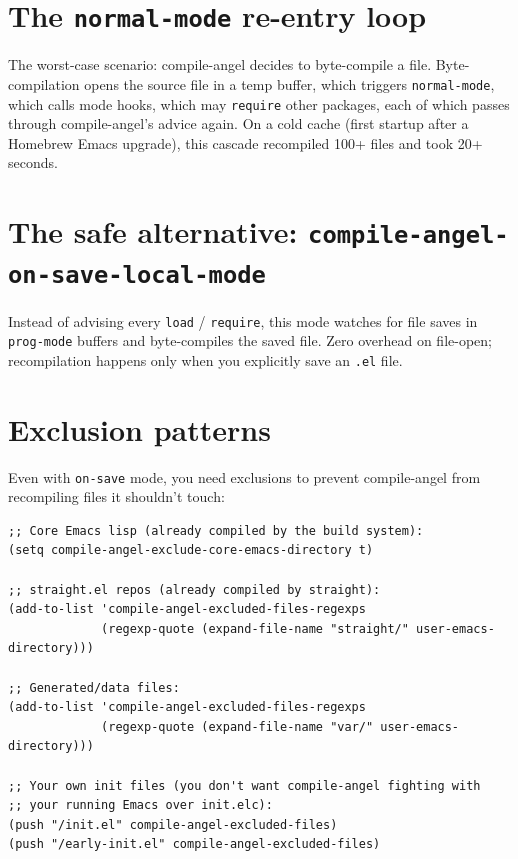 \section{The \texttt{normal-mode} re-entry loop}\label{the-normal-mode-re-entry-loop}

The worst-case scenario: compile-angel decides to byte-compile a file. Byte-compilation opens the source file in a temp buffer, which triggers \texttt{normal-mode}, which calls mode hooks, which may \texttt{require} other packages, each of which passes through compile-angel's advice again. On a cold cache (first startup after a Homebrew Emacs upgrade), this cascade recompiled 100+ files and took 20+ seconds.

\section{The safe alternative: \texttt{compile-angel-on-save-local-mode}}\label{the-safe-alternative-compile-angel-on-save-local-mode}

Instead of advising every \texttt{load} / \texttt{require}, this mode watches for file saves in \texttt{prog-mode} buffers and byte-compiles the saved file. Zero overhead on file-open; recompilation happens only when you explicitly save an \texttt{.el} file.

\section{Exclusion patterns}\label{exclusion-patterns}

Even with \texttt{on-save} mode, you need exclusions to prevent compile-angel from recompiling files it shouldn't touch:

\begin{verbatim}
;; Core Emacs lisp (already compiled by the build system):
(setq compile-angel-exclude-core-emacs-directory t)

;; straight.el repos (already compiled by straight):
(add-to-list 'compile-angel-excluded-files-regexps
             (regexp-quote (expand-file-name "straight/" user-emacs-directory)))

;; Generated/data files:
(add-to-list 'compile-angel-excluded-files-regexps
             (regexp-quote (expand-file-name "var/" user-emacs-directory)))

;; Your own init files (you don't want compile-angel fighting with
;; your running Emacs over init.elc):
(push "/init.el" compile-angel-excluded-files)
(push "/early-init.el" compile-angel-excluded-files)
\end{verbatim}

